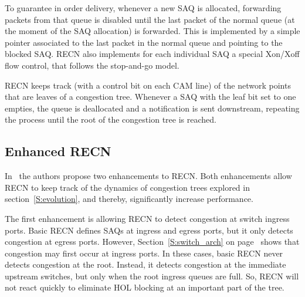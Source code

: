 \documentclass[12pt]{article}
\begin{document}
To guarantee in order delivery, whenever a new SAQ is allocated, forwarding packets from that queue is disabled until the last packet of the normal queue (at the moment of the SAQ allocation) is forwarded. This is implemented by a simple pointer associated to the last packet in the normal queue and pointing to the blocked SAQ. RECN also implements for each individual SAQ a special Xon/Xoff flow control, that follows the stop-and-go model. 

RECN keeps track (with a control bit on each CAM line) of the network points that are leaves of a congestion tree. Whenever a SAQ with the leaf bit set to one empties, the queue is deallocated and a notification is sent downstream, repeating the process until the root of the congestion tree is reached. 

\subsection{Enhanced RECN}\label{S:enhancedrecn}

In~\cite{paper2} the authors propose two enhancements to RECN. Both enhancements allow RECN to keep track of the dynamics of congestion trees explored in section~\ref{S:evolution}, and thereby, significantly increase performance.

The first enhancement is allowing RECN to detect congestion at switch ingress ports. Basic RECN defines SAQs at ingress and egress ports, but it only detects congestion at egress ports. However, Section~\ref{S:switch_arch} on page~\pageref{S:switch_arch} shows that congestion may first occur at ingress ports. In these cases, basic RECN never detects congestion at the root. Instead, it detects congestion at the immediate upstream switches, but only when the root ingress queues are full. So, RECN will not react quickly to eliminate HOL blocking at an important part of the tree. 
\end{document}

